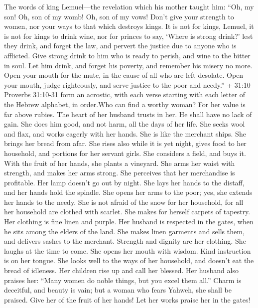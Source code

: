  The words of king Lemuel---the revelation which his mother
taught him:  ``Oh, my son! Oh, son of my womb! Oh, son of my
vows!  Don't give your strength to women, nor your ways to
that which destroys kings.  It is not for kings, Lemuel, it
is not for kings to drink wine, nor for princes to say, `Where is strong
drink?'  lest they drink, and forget the law, and pervert
the justice due to anyone who is afflicted.  Give strong
drink to him who is ready to perish, and wine to the bitter in soul.
 Let him drink, and forget his poverty, and remember his
misery no more.  Open your mouth for the mute, in the cause
of all who are left desolate.  Open your mouth, judge
righteously, and serve justice to the poor and needy.''  +
31:10 Proverbs 31:10-31 form an acrostic, with each verse starting with
each letter of the Hebrew alphabet, in order.Who can find a worthy
woman? For her value is far above rubies.  The heart of her
husband trusts in her. He shall have no lack of gain.  She
does him good, and not harm, all the days of her life.  She
seeks wool and flax, and works eagerly with her hands.  She
is like the merchant ships. She brings her bread from afar.
 She rises also while it is yet night, gives food to her
household, and portions for her servant girls.  She
considers a field, and buys it. With the fruit of her hands, she plants
a vineyard.  She arms her waist with strength, and makes
her arms strong.  She perceives that her merchandise is
profitable. Her lamp doesn't go out by night.  She lays her
hands to the distaff, and her hands hold the spindle.  She
opens her arms to the poor; yes, she extends her hands to the needy.
 She is not afraid of the snow for her household, for all
her household are clothed with scarlet.  She makes for
herself carpets of tapestry. Her clothing is fine linen and purple.
 Her husband is respected in the gates, when he sits among
the elders of the land.  She makes linen garments and sells
them, and delivers sashes to the merchant.  Strength and
dignity are her clothing. She laughs at the time to come. 
She opens her mouth with wisdom. Kind instruction is on her tongue.
 She looks well to the ways of her household, and doesn't
eat the bread of idleness.  Her children rise up and call
her blessed. Her husband also praises her:  ``Many women do
noble things, but you excel them all.''  Charm is
deceitful, and beauty is vain; but a woman who fears Yahweh, she shall
be praised.  Give her of the fruit of her hands! Let her
works praise her in the gates!
